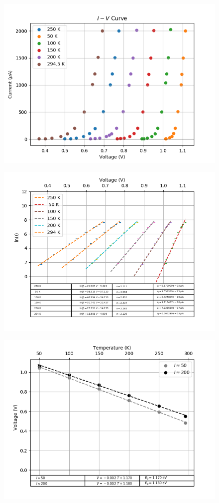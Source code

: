 \documentclass[8pt, a4paper]{article}
\begin{document}
\begin{figure}[h!]
\includegraphics{iv.png}
\end{figure}


\begin{figure}[h!]
\includegraphics{logiv.png}
\end{figure}

\begin{figure}[h!]
\includegraphics{vt.png}
\end{figure}
\end{document}
